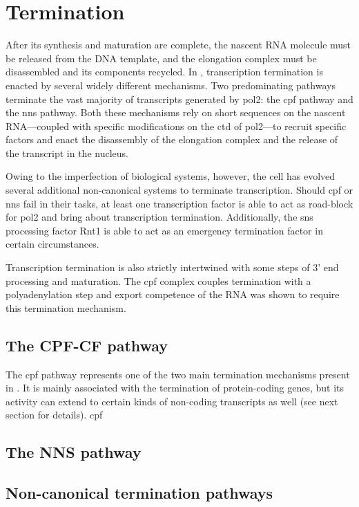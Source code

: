 \section{Termination} %
After its synthesis and maturation are complete, the nascent RNA molecule must be released from the DNA template, and the elongation complex must be disassembled and its components recycled.
In \cer{}, transcription termination is enacted by several widely different mechanisms.
Two predominating pathways terminate the vast majority of transcripts generated by \acrlong{pol2}: the \gls{cpf} pathway and the \gls{nns}  pathway. 
Both these mechanisms rely on short sequences on the nascent RNA---coupled with specific modifications on the \gls{ctd} of \gls{pol2}---to recruit specific factors and enact the disassembly of the elongation complex and the release of the transcript in the nucleus.

Owing to the imperfection of biological systems, however, the cell has evolved several additional non-canonical systems to terminate transcription. Should \gls{cpf} or \gls{nns} fail in their tasks, at least one transcription factor is able to act as road-block for \gls{pol2} and bring about transcription termination. Additionally, the \gls{sns} processing factor Rnt1 is able to act as an emergency termination factor in certain circumstances. 

Transcription termination is also strictly intertwined with some steps of 3' end processing and maturation. 
The \gls{cpf} complex couples termination with a polyadenylation step and export competence of the RNA was shown to require this termination mechanism.  




\subsection{The CPF-CF pathway}
The \gls{cpf} pathway represents one of the two main termination mechanisms present in \cer{}.
It is mainly associated with the termination of protein-coding genes, but its activity can extend to certain kinds of non-coding transcripts as well (see next section for details). 
\gls{cpf} 



\subsection{The NNS pathway}



\subsection{Non-canonical termination pathways}